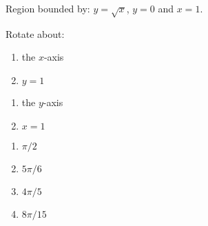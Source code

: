 {Region bounded by: $y=\sqrt{x}$, $y=0$ and $x=1$.

Rotate about:

\noindent%
\begin{minipage}[t]{.5\linewidth}
\begin{enumerate}
\item		the $x$-axis
\item		$y=1$
\end{enumerate}
\end{minipage}
\begin{minipage}[t]{.5\linewidth}
\begin{enumerate}\addtocounter{enumii}{2}
\item		the $y$-axis
\item		$x=1$
\end{enumerate}
\end{minipage}
}
{\begin{enumerate}
\item $\pi/2$
\item $5\pi/6$
\item $4\pi/5$
\item $8\pi/15$
\end{enumerate}
}
